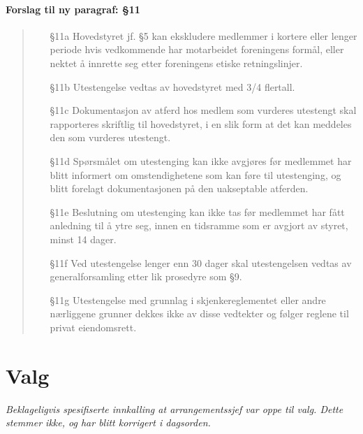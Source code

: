 \documentclass[10pt,norsk,a4paper]{article}
\begin{document}
\paragraph{Forslag til ny paragraf: §11}
\begin{quote}
    \begin{enumerate}
        \item[§11a] Hovedstyret jf. §5 kan ekskludere medlemmer i kortere eller lenger periode hvis vedkommende har motarbeidet foreningens formål, eller nektet å innrette seg etter foreningens etiske retningslinjer.
        \item[§11b] Utestengelse vedtas av hovedstyret med 3/4 flertall.
        \item[§11c] Dokumentasjon av atferd hos medlem som vurderes utestengt skal rapporteres skriftlig til hovedstyret, i en slik form at det kan meddeles den som vurderes utestengt.
        \item[§11d] Spørsmålet om utestenging kan ikke avgjøres før medlemmet har blitt informert om omstendighetene som kan føre til utestenging, og blitt forelagt dokumentasjonen på den uakseptable atferden.
        \item[§11e] Beslutning om utestenging kan ikke tas før medlemmet har fått anledning til å ytre seg, innen en tidsramme som er avgjort av styret, minst 14 dager.
        \item[§11f] Ved utestengelse lenger enn 30 dager skal utestengelsen vedtas av generalforsamling etter lik prosedyre som §9.
        \item[§11g] Utestengelse med grunnlag i skjenkereglementet eller andre nærliggene grunner dekkes ikke av disse vedtekter og følger reglene til privat eiendomsrett.
    \end{enumerate}
\end{quote}

\newpage

\section{Valg}

\textit{
    Beklageligvis spesifiserte innkalling at arrangementssjef var oppe til valg.
    Dette stemmer ikke, og har blitt korrigert i dagsorden.
}
\end{document}
